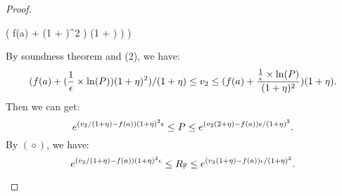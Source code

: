 \documentclass[a4paper,11pt]{article}
\begin{document}
\begin{proof}
\begin{itemize}
{\begin{mathpar}
{				%
				(
				f(a) + 
				{(1 + \eta)^2}
				)
				{(1 + \eta)}
				 \big)
				\bigg)
		}
		\end{mathpar}
}	
		By soundness theorem and (2), we have:
		$$(f(a) + 
				(\frac{1}{\epsilon} \times \ln(P))
				(1 + \eta)^2)/
				{(1 + \eta)}
		\leq v_2 \leq 
		(
		f(a) + \frac{\frac{1}{\epsilon} \times \ln(P)}
		{(1 + \eta)^2}){(1 + \eta)}.
		$$ 
		Then we can get:
		\\
		$$e^{(v_2 / (1 + \eta) - f(a))(1 + \eta)^2\epsilon}
		\leq P \leq 
		e^{(v_2 (2 + \eta) - f(a))\epsilon/(1 + \eta)^2}.$$
		By $(\diamond)$, we have:
		\\
		$$e^{(v_2 / (1 + \eta) - f(a))(1 + \eta)^2\epsilon}
		\leq R_{\mathbb{F}} \leq 
		e^{(v_2 (1 + \eta) - f(a))\epsilon/(1 + \eta)^2}.$$


\end{itemize}
\end{proof}
\end{document}
